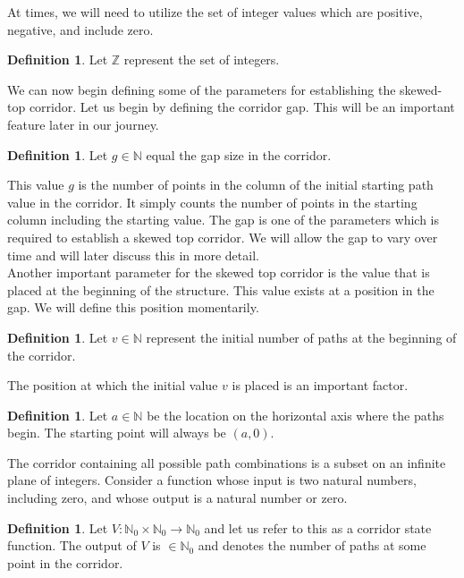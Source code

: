 \documentclass{article}
\newcommand*{\set}[1]{\mathbb{#1}}
\theoremstyle{definition}
\newtheorem{defn}[thm]{Definition}
\begin{document}
  \noindent At times, we will need to utilize the set of integer values which are positive, negative, and include zero. 
  \begin{defn} Let $\set{Z}$ represent the set of integers. \\ \end{defn}
  
  \noindent We can now begin defining some of the parameters for establishing the skewed-top corridor. Let us begin by defining 
  the corridor gap. This will be an important feature later in our journey. 
  \begin{defn} Let $g \in \set{N}$ equal the gap size in the corridor. \end{defn}
  \noindent This value $g$ is the number of points in the column of the initial starting path value in the corridor. It 
  simply counts the number of points in the starting column including the starting value. The gap is one of the parameters 
  which is required to establish a skewed top corridor. 
  We will allow the gap to vary over time and will later discuss this in more detail.\\
  
  \noindent Another important parameter for the skewed top corridor is the value that is placed at the 
  beginning of the structure. This value exists at a position in the gap. We will define this position momentarily.
  \begin{defn} Let $v \in \set{N}$ represent the initial number of paths at the beginning of the corridor.\\ \end{defn}
  
  \noindent The position at which the initial value $v$ is placed is an important factor. 
  \begin{defn} Let $a \in \set{N}$ be the location on the horizontal axis where the paths begin. The starting point 
  will always be $(a, 0)$.\\ \end{defn}

  \noindent The corridor containing all possible path combinations is a subset on an infinite plane of integers. Consider a function 
  whose input is two natural numbers, including zero, and whose output is a natural number or zero. 
  \begin{defn} Let $V \mathpunct{:} \set{N}_0 \times \set{N}_0 \rightarrow \set{N}_0$ and let us refer to this as a corridor state 
  function. The output of $V$ is $\in \set{N}_0$ and denotes the number of paths at some point in the corridor.\\ \end{defn}
  
\end{document}
